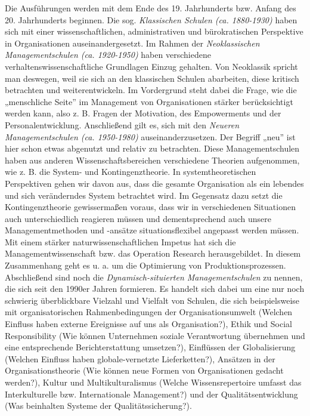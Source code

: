 \documentclass[
  letterpaper,
]{book}
\begin{document}
Die Ausführungen werden mit dem Ende des 19. Jahrhunderts bzw. Anfang
des 20. Jahrhunderts beginnen. Die sog. \emph{Klassischen Schulen (ca.
1880-1930)} haben sich mit einer wissenschaftlichen, administrativen und
bürokratischen Perspektive in Organisationen auseinandergesetzt. Im
Rahmen der \emph{Neoklassischen Managementschulen (ca. 1920-1950)} haben
verschiedene verhaltenswissenschaftliche Grundlagen Einzug gehalten. Von
Neoklassik spricht man deswegen, weil sie sich an den klassischen
Schulen abarbeiten, diese kritisch betrachten und weiterentwickeln. Im
Vordergrund steht dabei die Frage, wie die „menschliche Seite'' im
Management von Organisationen stärker berücksichtigt werden kann, also
z. B. Fragen der Motivation, des Empowerments und der
Personalentwicklung. Anschließend gilt es, sich mit den \emph{Neueren
Managementschulen (ca. 1950-1980)} auseinanderzusetzen. Der Begriff
„neu'' ist hier schon etwas abgenutzt und relativ zu betrachten. Diese
Managementschulen haben aus anderen Wissenschaftsbereichen verschiedene
Theorien aufgenommen, wie z. B. die System- und Kontingenztheorie. In
systemtheoretischen Perspektiven gehen wir davon aus, dass die gesamte
Organisation als ein lebendes und sich veränderndes System betrachtet
wird. Im Gegensatz dazu setzt die Kontingenztheorie gewissermaßen
voraus, dass wir in verschiedenen Situationen auch unterschiedlich
reagieren müssen und dementsprechend auch unsere Managementmethoden und
-ansätze situationsflexibel angepasst werden müssen. Mit einem stärker
naturwissenschaftlichen Impetus hat sich die Managementwissenschaft bzw.
das Operation Research herausgebildet. In diesem Zusammenhang geht es u.
a. um die Optimierung von Produktionsprozessen. Abschließend sind noch
die \emph{Dynamisch-situierten Managementschulen} zu nennen, die sich
seit den 1990er Jahren formieren. Es handelt sich dabei um eine nur noch
schwierig überblickbare Vielzahl und Vielfalt von Schulen, die sich
beispielsweise mit organisatorischen Rahmenbedingungen der
Organisationsumwelt (Welchen Einfluss haben externe Ereignisse auf uns
als Organisation?), Ethik und Social Responsibility (Wie können
Unternehmen soziale Verantwortung übernehmen und eine entsprechende
Berichterstattung umsetzen?), Einflüssen der Globalisierung (Welchen
Einfluss haben globale-vernetzte Lieferketten?), Ansätzen in der
Organisationstheorie (Wie können neue Formen von Organisationen gedacht
werden?), Kultur und Multikulturalismus (Welche Wissensrepertoire
umfasst das Interkulturelle bzw. Internationale Management?) und der
Qualitätsentwicklung (Was beinhalten Systeme der Qualitätssicherung?).
\end{document}
